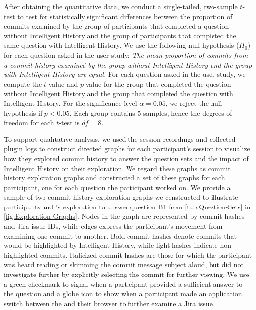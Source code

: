 After obtaining the quantitative data, we conduct a single-tailed, two-sample $t$-test to test for statistically significant differences 
between the proportion of commits examined by the group of participants that completed a question without Intelligent History and the group of participants 
that completed the same question with Intelligent History.
We use the following null hypothesis ($H_{0}$) for each question asked in the user study: 
\textit{The mean proportion of commits from a commit history examined by the group without Intelligent History and the group with Intelligent History are equal.}
For each question asked in the user study, we compute the $t$-value and $p$-value for the group that completed 
the question without Intelligent History and the group that completed the question with Intelligent History.
For the significance level $\alpha = 0.05$, we reject the null hypothesis if $p < 0.05$.
Each group contains 5 samples, hence the degrees of freedom for each $t$-test is $df = 8$.

To support qualitative analysis, we used the session recordings and collected plugin logs to construct directed graphs 
for each participant's session to visualize how they explored commit history to answer the question sets 
and the impact of Intelligent History on their exploration.
We regard these graphs as commit history exploration graphs and constructed a set of these graphs for each participant, 
one for each question the participant worked on.
We provide a sample of two commit history exploration graphs we constructed to illustrate 
participants  and ’s exploration to answer question B1 
from \autoref{tab:Question-Sets} in \autoref{fig:Exploration-Graphs}.
Nodes in the graph are represented by commit hashes and Jira issue IDs, 
while edges express the participant's movement from examining one commit to another.
Bold commit hashes denote commits that would be highlighted by Intelligent History, 
while light hashes indicate non-highlighted commits.
Italicized commit hashes are those for which the participant was heard reading or skimming the commit message subject aloud, 
but did not investigate further by explicitly selecting the commit for further viewing.
We use a green checkmark to signal when a participant provided a sufficient answer to the question 
and a globe icon to show when a participant made an application switch between the  
and their browser to further examine a Jira issue.

